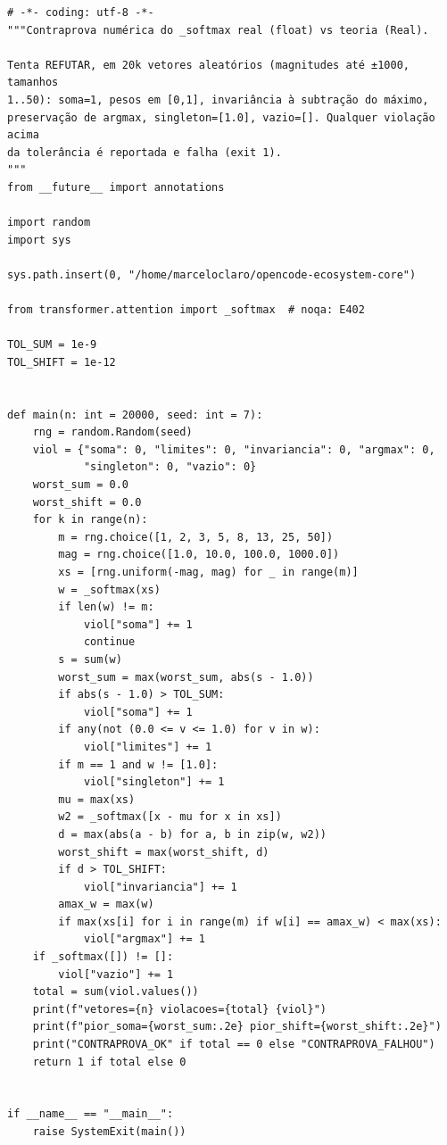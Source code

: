 \documentclass[12pt,openany,oneside,a4paper,brazil,chapter=TITLE]{abntex2}
\begin{document}
\begin{lstlisting}
# -*- coding: utf-8 -*-
"""Contraprova numérica do _softmax real (float) vs teoria (Real).

Tenta REFUTAR, em 20k vetores aleatórios (magnitudes até ±1000, tamanhos
1..50): soma=1, pesos em [0,1], invariância à subtração do máximo,
preservação de argmax, singleton=[1.0], vazio=[]. Qualquer violação acima
da tolerância é reportada e falha (exit 1).
"""
from __future__ import annotations

import random
import sys

sys.path.insert(0, "/home/marceloclaro/opencode-ecosystem-core")

from transformer.attention import _softmax  # noqa: E402

TOL_SUM = 1e-9
TOL_SHIFT = 1e-12


def main(n: int = 20000, seed: int = 7):
    rng = random.Random(seed)
    viol = {"soma": 0, "limites": 0, "invariancia": 0, "argmax": 0,
            "singleton": 0, "vazio": 0}
    worst_sum = 0.0
    worst_shift = 0.0
    for k in range(n):
        m = rng.choice([1, 2, 3, 5, 8, 13, 25, 50])
        mag = rng.choice([1.0, 10.0, 100.0, 1000.0])
        xs = [rng.uniform(-mag, mag) for _ in range(m)]
        w = _softmax(xs)
        if len(w) != m:
            viol["soma"] += 1
            continue
        s = sum(w)
        worst_sum = max(worst_sum, abs(s - 1.0))
        if abs(s - 1.0) > TOL_SUM:
            viol["soma"] += 1
        if any(not (0.0 <= v <= 1.0) for v in w):
            viol["limites"] += 1
        if m == 1 and w != [1.0]:
            viol["singleton"] += 1
        mu = max(xs)
        w2 = _softmax([x - mu for x in xs])
        d = max(abs(a - b) for a, b in zip(w, w2))
        worst_shift = max(worst_shift, d)
        if d > TOL_SHIFT:
            viol["invariancia"] += 1
        amax_w = max(w)
        if max(xs[i] for i in range(m) if w[i] == amax_w) < max(xs):
            viol["argmax"] += 1
    if _softmax([]) != []:
        viol["vazio"] += 1
    total = sum(viol.values())
    print(f"vetores={n} violacoes={total} {viol}")
    print(f"pior_soma={worst_sum:.2e} pior_shift={worst_shift:.2e}")
    print("CONTRAPROVA_OK" if total == 0 else "CONTRAPROVA_FALHOU")
    return 1 if total else 0


if __name__ == "__main__":
    raise SystemExit(main())
\end{lstlisting}
\end{document}
